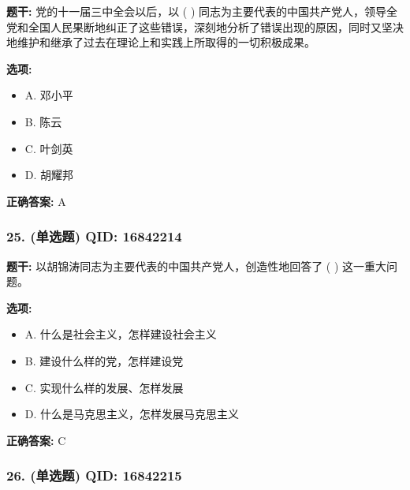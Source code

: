 \documentclass[12pt,UTF8]{ctexart}
\begin{document}
\textbf{题干:}
党的十一届三中全会以后，以 ( ) 同志为主要代表的中国共产党人，领导全党和全国人民果断地纠正了这些错误，深刻地分析了错误出现的原因，同时又坚决地维护和继承了过去在理论上和实践上所取得的一切积极成果。

\textbf{选项:}
\begin{itemize}[leftmargin=*]

  \item A. 邓小平

  \item B. 陈云

  \item C. 叶剑英

  \item D. 胡耀邦

\end{itemize}

\textbf{正确答案:}
A

\vspace{0.3em}\hrulefill\vspace{0.7em}

\subsubsection*{25. (单选题) \small QID: 16842214}

\textbf{题干:}
以胡锦涛同志为主要代表的中国共产党人，创造性地回答了 ( ) 这一重大问题。

\textbf{选项:}
\begin{itemize}[leftmargin=*]

  \item A. 什么是社会主义，怎样建设社会主义

  \item B. 建设什么样的党，怎样建设党

  \item C. 实现什么样的发展、怎样发展

  \item D. 什么是马克思主义，怎样发展马克思主义

\end{itemize}

\textbf{正确答案:}
C

\vspace{0.3em}\hrulefill\vspace{0.7em}

\subsubsection*{26. (单选题) \small QID: 16842215}
\end{document}

